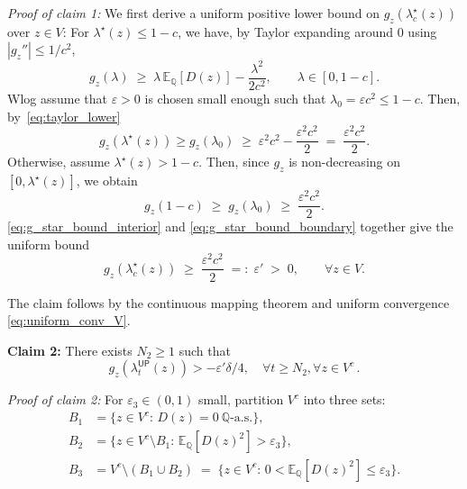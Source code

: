 \documentclass[12pt,twoside]{article}
\theoremstyle{plain}
\theoremstyle{definition}
\theoremstyle{remark}
\newcommand{\Esymb}{\mathbb{E}}
\newcommand{\Qsymb}{\mathbb{Q}}
\newcommand{\Ex}[2]{\Esymb_{{#1}}\left[{#2}\right]}
\newcommand{\fbet}{\lambda}  %
\newcommand{\up}{\mathsf{UP}}
\begin{document}
\emph{Proof of claim 1:} We first derive a uniform positive lower
bound on $g_z(\fbet^\star_c(z))$ over $z\in V$:
For $\lambda^\star(z)\le 1-c$, we have,
by Taylor expanding around $0$ using $|g_z''|\le 1/c^2$,
\begin{equation}\label{eq:taylor_lower}
    g_z(\lambda) \;\ge\; \lambda\,\Ex{\Qsymb}{D(z)} - \frac{\lambda^2}{2c^2},
    \qquad \lambda\in[0,1-c].
\end{equation}
Wlog assume that $\varepsilon>0$ is chosen small enough such that
$\lambda_0=\varepsilon c^2 \le 1-c$. Then, by~\eqref{eq:taylor_lower}
\begin{equation}\label{eq:g_star_bound_interior}
    g_z(\lambda^\star(z)) \geq g_z(\lambda_0)
    \;\ge\; \varepsilon^2 c^2 - \frac{\varepsilon^2 c^2}{2}
    \;=\; \frac{\varepsilon^2 c^2}{2}.
\end{equation}
Otherwise, assume
 $\lambda^\star(z)> 1-c$. Then, since $g_z$ is
non-decreasing on $[0,\lambda^\star(z)]$, we obtain
\begin{equation}\label{eq:g_star_bound_boundary}
    g_z(1-c) \;\ge\; g_z(\lambda_0) \;\ge\; \frac{\varepsilon^2 c^2}{2}.
\end{equation}
\eqref{eq:g_star_bound_interior} and \eqref{eq:g_star_bound_boundary} together give the uniform bound
\begin{equation*}
    g_z(\fbet^\star_c(z)) \;\ge\; \frac{\varepsilon^2 c^2}{2}\;=:\;\varepsilon'
    \;>\;0,\qquad\forall z\in V.
\end{equation*}

The claim follows by the continuous mapping theorem and uniform convergence
\eqref{eq:uniform_conv_V}. 


\textbf{Claim 2:} There exists $N_2\ge 1$
such that \begin{equation*}
    g_z(\fbet_t^\up(z))>-\varepsilon'\delta/4, \quad \forall t\ge N_2, \forall z\in V^c\,.
\end{equation*}

\emph{Proof of claim 2:} For $\varepsilon_3\in(0,1)$ small, partition $V^c$ into three sets:
\begin{align*}
    B_1 &= \bigl\{z\in V^c:\, D(z)=0\ \Qsymb\text{-a.s.}\bigr\},\\
    B_2 &= \bigl\{z\in V^c\setminus B_1:\,\Ex{\Qsymb}{D(z)^2}>\varepsilon_3\bigr\},\\
    B_3 &= V^c\setminus(B_1\cup B_2) \;=\;
    \bigl\{z\in V^c:\,0<\Ex{\Qsymb}{D(z)^2}\le\varepsilon_3\bigr\}.
\end{align*}
\end{document}
